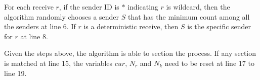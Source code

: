 For each receive $r$, if the sender ID is $\ast$ indicating $r$ is wildcard, then the algorithm randomly chooses a sender $S$ that has the minimum count among all the senders at line 6. If $r$ is a deterministic receive, then $S$ is the specific sender for $r$ at line 8.

Given the steps above, the algorithm is able to section the process. If any section is matched at line 15, the variables $\mathit{cur}$, $N_r$ and $N_k$ need to be reset at line 17 to line 19. 


 

\begin{comment}
$\mathit{P}$ is a set of all the processes in a CTP. 
$frm_t$ is a set of the unique identifiers of all the senders for the receiver $p_t$. 
The identifier of a sender can be removed from $frm_t$ once the sender has no send to be distributed to $p_t$.
The list $R_t$ contains all the sequential receives in process $p_t$.
$\mathit{NR}_{t}$ is the number of all the receives in $R_t$.
The list $S_{tf}$ contains all the sequential sends from the sender $p_f$ to the receiver $p_t$. 
$\mathit{NS}_{tf}$ is the number of the sends in $S_{tf}$ that are distributed to a specific section.

Given the data structures defined, the presentation explains \algoref{algo:main} in detail.
The algorithm iteratively checks each receive at line 2 until $R_t$ is empty.  
$\mathrm{SECTIONMATCH}$ computes the number of receives in each section at line 3. The value is assigned to $N_k$. 
$\mathrm{DISTRIBUTESENDS}$ updates the count of the distributed sends ($\mathit{NS}$) from each sender to a common section in the receiver $p_t$ at line 7. 
$\mathit{NS_{tf}}$ is initialized for each sender $p_f$ at line 4 through line 6.
$\mathrm{MATCHAPPROX}$ then stores the generated match pairs for each section in $M$ at line 8. 
Finally, the receives and the sends in each section are removed from the CTP at line 9 through line 14. 
The function $\mathrm{REMOVE}$ removes elements from the beginning of a list given two inputs: the list to remove from and the number of operations to remove. 


\end{comment}

